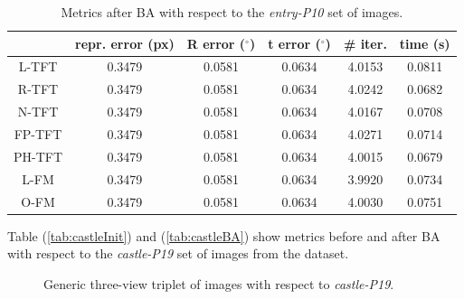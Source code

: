 \begin{table}[htbp]
  \centering
  \caption[\textit{entry-P10} Metrics with \acs{BA}]{Metrics after \acs{BA} with respect to the \textit{entry-P10} set of images.}
  \label{tab:entryBA}
  \begin{tabular}{|*{6}{c}|}
    \hline
     & repr. error (px) & R error ($^{\circ}$) & t error ($^{\circ}$) & \# iter. & time (s)\\
    \hline
    \acs{L-TFT} & 0.3479 & 0.0581 & 0.0634 & 4.0153 & 0.0811 \\
    \acs{R-TFT} & 0.3479 & 0.0581 & 0.0634 & 4.0242 & 0.0682 \\
    \acs{N-TFT} & 0.3479 & 0.0581 & 0.0634 & 4.0167 & 0.0708 \\
    \acs{FP-TFT} & 0.3479 & 0.0581 & 0.0634 & 4.0271 & 0.0714 \\
    \acs{PH-TFT} & 0.3479 & 0.0581 & 0.0634 & 4.0015 & 0.0679 \\
    \acs{L-FM} & 0.3479 & 0.0581 & 0.0634 & 3.9920 & 0.0734 \\
    \acs{O-FM} & 0.3479 & 0.0581 & 0.0634 & 4.0030 & 0.0751 \\
    \hline
  \end{tabular}
\end{table}

\pagebreak

Table (\ref{tab:castleInit}) and (\ref{tab:castleBA}) show metrics before and after \acs{BA} with respect to the \textit{castle-P19} set of images from the dataset.

\begin{figure}[h]
    \centering
    \caption[\textit{castle-P19} Triplet]{Generic three-view triplet of images with respect to \textit{castle-P19}. \cite{13-epfl-dataset}}
    \label{fig:castleImage}
\end{figure}

